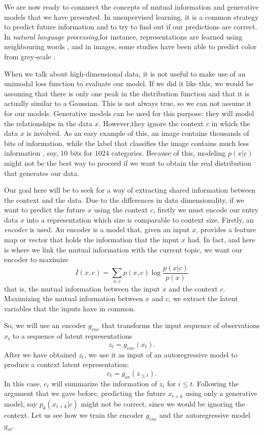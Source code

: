 We are now ready to connnect the concepts of mutual information and generative models that we have presented. In unsupervised learning,
it is a common strategy to predict future information and to try to find out if our predictions are correct.
In \emph{natural language processing},for instance, representations are learned 
using neighbouring words \citep{mikolov_efficient_2013}, and in images, some studies have been able to predict color from grey-scale \citep{doersch_unsupervised_2016}.

When we talk about high-dimensional data, it is not useful to make use of an unimodal loss function to evaluate our model. If we did it like this, we would be assuming that there is only
one peak in the distribution function and that it is actually similar to a Gaussian.  This is not always true, so we can not assume it for our models. Generative models can be used for this purpose:
they will model the relationships in the data $x$. However,they ignore the context $c$ in which the data $x$ is involved. As an easy example of this, an image contains thousands of bits of information,
while the label that classifies the image contains much less information , say, $10$ bits for $1024$ categories. Because of this, modeling $p(x|c)$ might not be the best way to proceed if we want
to obtain the real distribution that generates our data. 

Our goal here will be to seek for a way of extracting shared information between the context and the data. Due to the differences in data dimensionality, if we want to predict the future $x$ using the context $c$, firstly we must
encode our entry data $x$ into a representation which size is comparable to context size. Firstly, an \emph{encoder} is used. An encoder is a model that, given an input $x$, provides a feature map or vector that holds the information
that the input $x$ had. In fact, and here is where we link the mutual information with the current topic, we want our encoder to maximize
$$
I(x,c) = \sum_{x,c}p(x,c)\log\frac{p(x|c)}{p(x)}
$$
that is, the mutual information between the input $x$ and the context $c$.  Maximizing the mutual information between $x$ and $c$, we extract the latent variables
that the inputs have in common.

So, we will use an encoder $g_{enc}$ that transforms the input sequence of observations $x_t$ to a sequence of latent representations
$$
z_t = g_{enc}(x_t).
$$
After we have obtained $z_t$, we use it as input of an autoregressive model to produce a context latent representation:
$$
c_t = g_{ar}(z_{\leq t}).
$$
In this case, $c_t$ will summarize the information of $z_i$ for $i \leq t$. Following the argument that we gave before, predicting the future $x_{t+k}$ using only a generative model, say $p_k(x_{t+k}|c)$
might not be correct, since we would be ignoring the context. Let us see how we train the encoder $g_{enc}$ and the autoregressive model $g_{ar}$.

